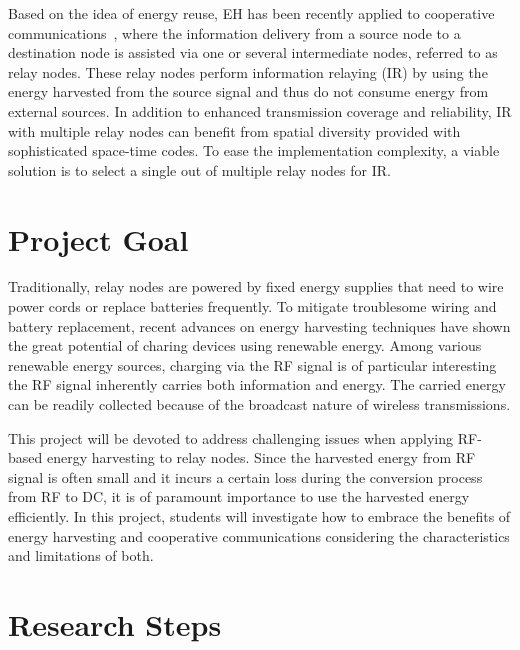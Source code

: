 \documentclass[12pt]{article}%
\begin{document}
Based on the idea of energy reuse, EH has been recently applied to
cooperative communications~\cite{Liu2015}, where the information
delivery from a source node to a destination node is assisted via
one or several intermediate nodes, referred to as relay nodes. These
relay nodes perform information relaying (IR) by using the energy
harvested from the source signal and thus do not consume energy from
external sources. In addition to enhanced transmission coverage and
reliability, IR with multiple relay nodes can benefit from spatial
diversity provided with sophisticated space-time codes. To ease the
implementation complexity, a viable solution is to select a single
out of multiple relay nodes for IR.

\section{Project Goal}
Traditionally, relay nodes are powered by fixed energy supplies that
need to wire power cords or replace batteries frequently. To
mitigate troublesome wiring and battery replacement, recent advances
on energy harvesting techniques have shown the great potential of
charing devices using renewable energy. Among various renewable
energy sources, charging via the RF signal is of particular
interesting the RF signal inherently carries both information and
energy. The carried energy can be readily collected because of the
broadcast nature of wireless transmissions.

This project will be devoted to address challenging issues when
applying RF-based energy harvesting to relay nodes. Since the
harvested energy from RF signal is often small and it incurs a
certain loss during the conversion process from RF to DC, it is of
paramount importance to use the harvested energy efficiently. In
this project, students will investigate how to embrace the benefits
of energy harvesting and cooperative communications considering the
characteristics and limitations of both.

\section{Research Steps}
\end{document}
